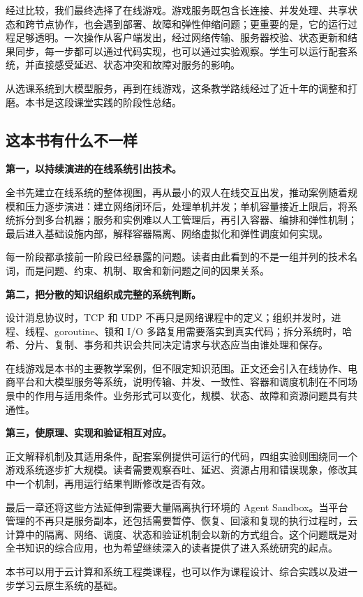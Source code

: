 经过比较，我们最终选择了在线游戏。游戏服务既包含长连接、并发处理、共享状态和跨节点协作，也会遇到部署、故障和弹性伸缩问题；更重要的是，它的运行过程足够透明。一次操作从客户端发出，经过网络传输、服务器校验、状态更新和结果同步，每一步都可以通过代码实现，也可以通过实验观察。学生可以运行配套系统，并直接感受延迟、状态冲突和故障对服务的影响。

从选课系统到大模型服务，再到在线游戏，这条教学路线经过了近十年的调整和打磨。本书是这段课堂实践的阶段性总结。

\subsection*{这本书有什么不一样}

\textbf{第一，以持续演进的在线系统引出技术。}

全书先建立在线系统的整体视图，再从最小的双人在线交互出发，推动案例随着规模和压力逐步演进：建立网络闭环后，处理单机并发；单机容量接近上限后，将系统拆分到多台机器；服务和实例难以人工管理后，再引入容器、编排和弹性机制；最后进入基础设施内部，解释容器隔离、网络虚拟化和弹性调度如何实现。

每一阶段都承接前一阶段已经暴露的问题。读者由此看到的不是一组并列的技术名词，而是问题、约束、机制、取舍和新问题之间的因果关系。

\textbf{第二，把分散的知识组织成完整的系统判断。}

设计消息协议时，TCP 和 UDP 不再只是网络课程中的定义；组织并发时，进程、线程、goroutine、锁和 I/O 多路复用需要落实到真实代码；拆分系统时，哈希、分片、复制、事务和共识会共同决定请求与状态应当由谁处理和保存。

在线游戏是本书的主要教学案例，但不限定知识范围。正文还会引入在线协作、电商平台和大模型服务等系统，说明传输、并发、一致性、容器和调度机制在不同场景中的作用与适用条件。业务形式可以变化，规模、状态、故障和资源问题具有共通性。

\textbf{第三，使原理、实现和验证相互对应。}

正文解释机制及其适用条件，配套案例提供可运行的代码，四组实验则围绕同一个游戏系统逐步扩大规模。读者需要观察吞吐、延迟、资源占用和错误现象，修改其中一个机制，再用运行结果判断修改是否有效。

最后一章还将这些方法延伸到需要大量隔离执行环境的 Agent Sandbox。当平台管理的不再只是服务副本，还包括需要暂停、恢复、回滚和复现的执行过程时，云计算中的隔离、网络、调度、状态和验证机制会以新的方式组合。这个问题既是对全书知识的综合应用，也为希望继续深入的读者提供了进入系统研究的起点。

本书可以用于云计算和系统工程类课程，也可以作为课程设计、综合实践以及进一步学习云原生系统的基础。

